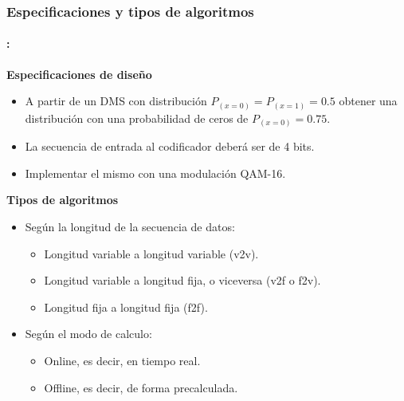 \begin{frame}
  \frametitle{\textbf{Especificaciones y tipos de algoritmos}}
\framesubtitle{\secname : \subsecname}

\begin{block}{\centering \textbf{Especificaciones de diseño}}
    \begin{itemize}\Small
        \item A partir de un DMS con distribución $ P_{(x=0)}= P_{(x=1)}=0.5$ obtener una distribución con una probabilidad de ceros de $P_{(x=0)}= 0.75$.
        \item La secuencia de entrada al codificador deberá ser de 4 bits.
        \item Implementar el mismo con una modulación QAM-16.
    \end{itemize}
\end{block}
\vspace{-0.2cm}
 \begin{block}{\centering \textbf{Tipos de algoritmos}}
     \begin{itemize}\Small
         \item  Según la longitud de la secuencia de datos:
                \begin{itemize}
                     \item Longitud variable a longitud variable (v2v).
                     \item Longitud variable a longitud fija, o viceversa (v2f o f2v).
                     \item Longitud fija a longitud fija (f2f).
                \end{itemize}
        \item   Según el modo de calculo:
                \begin{itemize}
                    \item Online, es decir, en tiempo real.
                    \item Offline, es decir, de forma precalculada.
                \end{itemize}
     \end{itemize}
     
\end{block}

\end{frame}

